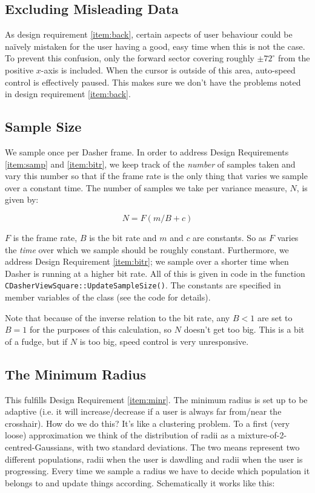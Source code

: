 \documentclass[a4paper,11pt,notitlepage]{article}
\begin{document}
\subsection{Excluding Misleading Data}

As design requirement \ref{item:back}, certain aspects of user
behaviour could be na\"ively mistaken for the user having a good, easy
time when this is not the case. To prevent this confusion, only the
forward sector covering roughly $\pm72^{\circ}$ from the positive
$x$-axis is included. When the cursor is outside of this area,
auto-speed control is effectively paused. This makes sure we don't
have the problems noted in design requirement \ref{item:back}.

\subsection{Sample Size}\label{sec:Size}

We sample once per Dasher frame. In order to address Design
Requirements \ref{item:samp} and \ref{item:bitr}, we keep track of the
\emph{number} of samples taken and vary this number so that if the
frame rate is the only thing that varies we sample over a constant
time. The number of samples we take per variance measure, $N$, is
given by:

\begin{equation}
N = F(m/B + c)
\end{equation}

$F$ is the frame rate, $B$ is the bit rate and $m$ and $c$ are
constants. So as $F$ varies the \emph{time} over which we sample
should be roughly constant. Furthermore, we address Design Requirement
\ref{item:bitr}; we sample over a shorter time when Dasher is running
at a higher bit rate. All of this is given in code in the function
\texttt{CDasherViewSquare::UpdateSampleSize()}. The constants are
specified in member variables of the class (see the code for details).

Note that because of the inverse relation to the bit rate, any $B < 1$
are set to $B = 1$ for the purposes of this calculation, so $N$
doesn't get too big. This is a bit of a fudge, but if $N$ is too big,
speed control is very unresponsive.

\subsection{The Minimum Radius}\label{sec:exr}

This fulfills Design Requirement \ref{item:minr}. The minimum radius
is set up to be adaptive (i.e. it will increase/decrease if a user
is always far from/near the crosshair). How do we do this? It's like a
clustering problem. To a first (very loose) approximation we think of
the distribution of radii as a mixture-of-2-centred-Gaussians, with
two standard deviations. The two means represent two different
populations, radii when the user is dawdling and radii when the user
is progressing. Every time we sample a radius we have to decide which
population it belongs to and update things according. Schematically it
works like this:
\end{document}
